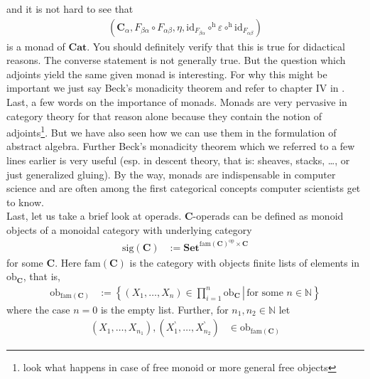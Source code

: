 and it is not hard to see that
\begin{align*}
  \left(
    \mathbf{C}_{\alpha},
    F_{\beta\alpha}
    \circ
    F_{\alpha\beta},
    \eta,
    \mathrm{id}_{F_{\beta\alpha}}
    \circ^{\textrm{h}}
    \varepsilon
    \circ^{\textrm{h}}
    \mathrm{id}_{F_{\alpha\beta}}
  \right)
\end{align*}
is a monad of $\mathbf{Cat}$. You should definitely verify that this is true for didactical reasons. The converse statement is not generally true. But the question which adjoints yield the same given monad is interesting. For why this might be important we just say {\glqq}Beck's monadicity theorem{\grqq} and refer to chapter IV in \cite{c55c71e8}. Last, a few words on the importance of monads. Monads are very pervasive in category theory for that reason alone because they contain the notion of adjoints\footnote{look what happens in case of free monoid or more general free objects}. But we have also seen how we can use them in the formulation of abstract algebra. Further Beck's monadicity theorem which we referred to a few lines earlier is very useful (esp. in descent theory, that is: sheaves, stacks, \ldots, or just generalized gluing). By the way, monads are indispensable in computer science and are often among the first categorical concepts computer scientists get to know.
\\
Last, let us take a brief look at operads. $\mathbf{C}$-operads can be defined as monoid objects of a monoidal category with underlying category
\begin{align*}
  \mathrm{sig}(\mathbf{C})
  &:=
  \mathbf{Set}^{\mathrm{fam}(\mathbf{C})^{\mathrm{op}} \times \mathbf{C}}
\end{align*}
for some $\mathbf{C}$. Here $\mathrm{fam}(\mathbf{C})$ is the category with objects finite lists of elements in $\mathrm{ob}_{\mathbf{C}}$, that is,
\begin{align*}
  \mathrm{ob}_{\mathrm{fam}(\mathbf{C})}
  &:=
  \left\lbrace
    \left.
      (X_{1},\ldots,X_{n})
      \in
      \prod_{i=1}^{n}
      \mathrm{ob}_{\mathbf{C}}
    \,
    \right\vert
    \,
      \text{for some }
      n
      \in
      \mathbb{N}
  \right\rbrace
\end{align*}
where the case $n=0$ is the empty list. Further, for $n_{1},n_{2} \in \mathbb{N}$ let
\begin{align*}
  (X_{1},\ldots,X_{n_{1}}),
  (X_{1}^{\backprime},\ldots,X_{n_{2}}^{\backprime})
  &\in
  \mathrm{ob}_{\mathrm{fam}(\mathbf{C})}
\end{align*}
